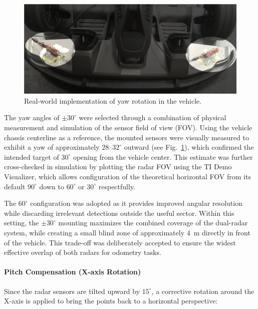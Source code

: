 \begin{figure}[!htbp]
    \centering
    \includegraphics[width=0.8\linewidth]{images/vehicleRadarYawRotationHighlited.png}
    \caption{Real-world implementation of yaw rotation in the vehicle.}
    \label{fig:vehicleRadarYawRotation}
\end{figure}


The yaw angles of $\pm30^\circ$ were selected through a combination of physical measurement and simulation of the sensor field of view (FOV).  
Using the vehicle chassis centerline as a reference, the mounted sensors were visually measured to exhibit a yaw of approximately $28$--$32^\circ$ outward (see Fig.~\ref{fig:vehicleRadarYawRotation}), which confirmed the intended target of $30^\circ$ opening from the vehicle center.  
This estimate was further cross-checked in simulation by plotting the radar FOV using the TI Demo Visualizer, which allows configuration of the theoretical horizontal FOV from its default $90^\circ$ down to $60^\circ$ or $30^\circ$ respectfully.  

The $60^\circ$ configuration was adopted as it provides improved angular resolution while discarding irrelevant detections outside the useful sector.  
Within this setting, the $\pm30^\circ$ mounting maximizes the combined coverage of the dual-radar system, while creating a small blind zone of approximately $4$~m directly in front of the vehicle.  
This trade-off was deliberately accepted to ensure the widest effective overlap of both radars for odometry tasks.

\vspace{0.5em}
\paragraph{Pitch Compensation (X-axis Rotation)}
Since the radar sensors are tilted upward by $15^\circ$, a corrective rotation around the X-axis is applied to bring the points back to a horizontal perspective: 

